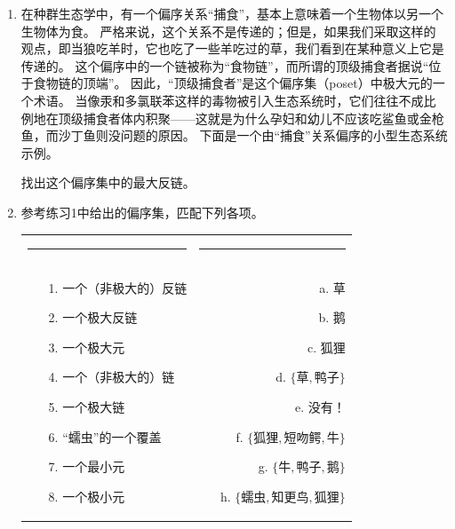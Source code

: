 \begin{enumerate}
    \item 在种群生态学中，有一个偏序关系“捕食”，基本上意味着一个生物体以另一个生物体为食。
    严格来说，这个关系不是传递的；但是，如果我们采取这样的观点，即当狼吃羊时，它也吃了一些羊吃过的草，我们看到在某种意义上它是传递的。
    这个偏序中的一个链被称为“食物链”，而所谓的顶级捕食者据说“位于食物链的顶端”。
    因此，“顶级捕食者”是这个偏序集（poset）中极大元的一个术语。
    当像汞和多氯联苯这样的毒物被引入生态系统时，它们往往不成比例地在顶级捕食者体内积聚——这就是为什么孕妇和幼儿不应该吃鲨鱼或金枪鱼，而沙丁鱼则没问题的原因。
    下面是一个由“捕食”关系偏序的小型生态系统示例。
    
    \begin{center}
    
    \end{center}
    
    找出这个偏序集中的最大反链。
    
    \newpage
    
    \item 参考练习1中给出的偏序集，匹配下列各项。
    
    \begin{tabular}{lr}
    \rule{2.3in}{0pt} & \rule{2.3in}{0pt} \\
    \begin{minipage}[b]{.4\textwidth}
    \begin{enumerate}
    \item[1.] 一个（非极大的）反链
    \item[2.] 一个极大反链
    \item[3.] 一个极大元
    \item[4.] 一个（非极大的）链
    \item[5.] 一个极大链
    \item[6.] “蠕虫”的一个覆盖
    \item[7.] 一个最小元
    \item[8.] 一个极小元
    \end{enumerate}
    \end{minipage} 
     & 
    \begin{minipage}[b]{.4\textwidth}
    \begin{enumerate}
    \item[a.] 草
    \item[b.] 鹅
    \item[c.] 狐狸
    \item[d.] $\{ \mbox{草}, \mbox{鸭子} \}$
    \item[e.] 没有！
    \item[f.] $\{ \mbox{狐狸}, \mbox{短吻鳄}, \mbox{牛} \}$
    \item[g.] $\{ \mbox{牛}, \mbox{鸭子},  \mbox{鹅} \}$
    \item[h.] $\{ \mbox{蠕虫}, \mbox{知更鸟}, \mbox{狐狸} \}$
    \end{enumerate} 
    \end{minipage} \\
    \end{tabular}
    

\end{enumerate}
